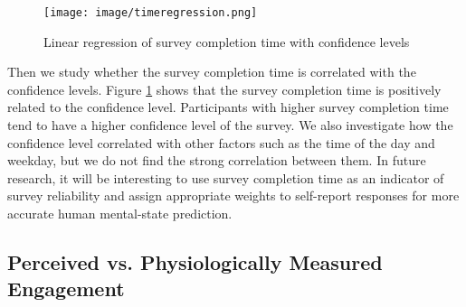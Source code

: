 \documentclass[sigconf]{acmart}
\begin{document}
\begin{figure}
    \centering
    \texttt{[image: image/timeregression.png]}
    \caption{Linear regression of survey completion time with confidence levels }
    \label{fig:regression}
\end{figure}

Then we study whether the survey completion time is correlated with the confidence levels. Figure \ref{fig:regression} shows that the survey completion time is positively related to the confidence level. Participants with higher survey completion time tend to have a higher confidence level of the survey. We also investigate how the confidence level correlated with other factors such as the time of the day and weekday, but we do not find the strong correlation between them. In future research, it will be interesting to use survey completion time as an indicator of survey reliability and assign appropriate weights to self-report responses for more accurate human mental-state prediction.
\begin{comment}
\begin{figure}
    \centering
    \texttt{[image: image/result.pdf]}
    \caption{Prediction performance across different classifiers}
    \label{fig:my_label}
\end{figure}
\end{comment}


\subsection{Perceived vs. Physiologically Measured Engagement}
\end{document}
